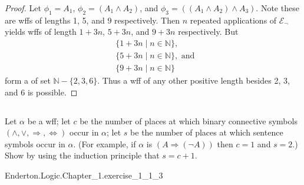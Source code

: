 \documentclass{report}
\begin{document}
\begin{proof}
      Let $\phi_1 = A_1$, $\phi_2 = (A_1 \land A_2)$, and
        $\phi_3 = ((A_1 \land A_2) \land A_3)$.
      Note these are wffs of lengths 1, 5, and 9 respectively.
      Then $n$ repeated applications of $\mathcal{E}_{\neg}$ yields wffs of
        length $1 + 3n$, $5 + 3n$, and $9 + 3n$ respectively.
      But
        \begin{align*}
          & \{ 1 + 3n \mid n \in \mathbb{N} \}, \\
          & \{ 5 + 3n \mid n \in \mathbb{N} \}, \text{ and } \\
          & \{ 9 + 3n \mid n \in \mathbb{N} \}
        \end{align*}
        form a  of set $\mathbb{N} - \{ 2, 3, 6 \}$.
      Thus a wff of any other positive length besides 2, 3, and 6 is possible.

  \end{proof}

\subsection{}%

  Let $\alpha$ be a wff; let $c$ be the number of places at which binary
    connective symbols $(\land, \lor, \Rightarrow, \Leftrightarrow)$ occur in
    $\alpha$; let $s$ be the number of places at which sentence symbols occur in
    $\alpha$.
  (For example, if $\alpha$ is $(A \Rightarrow (\neg A))$ then $c = 1$ and
    $s = 2$.)
  Show by using the induction principle that $s = c + 1$.

    {Enderton.Logic.Chapter\_1.exercise\_1\_1\_3}
\end{document}
